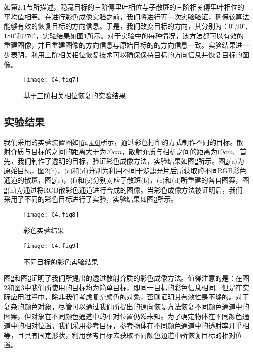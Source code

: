 如第2.1节所描述，隐藏目标的三阶傅里叶相位与子散斑的三阶相关傅里叶相位的平均值相等。在进行彩色成像实验之前，我们将进行再一次实验验证，确保该算法能够有效的恢复目标的方向信息。于是，我们改变目标的方向，其分别为：$0^{\circ}$,$90^{\circ}$,$180^{\circ}$和$270^{\circ}$，实验结果如图\ref{fig:4.7}所示。对于实验中的每种情况，该方法都可以有效的重建图像，并且重建图像的方向信息与原始目标的的方向信息一致。实验结果进一步表明，利用三阶相关相位恢复技术可以确保保持目标的方向信息并恢复目标的图像。

\begin{figure}[htp]
	\centering
	\texttt{[image: C4.fig7]}
	\caption{基于三阶相关相位恢复的实验结果}
	\label{fig:4.7}
\end{figure}

\subsection{实验结果}

我们采用的实验装置图如\ref{fig:4.6}所示，通过彩色打印的方式制作不同的目标。散射介质与目标的之间的距离大于为$70cm$，散射介质与相机之间的距离为$10cm$。首先，我们制作了透明的目标，验证彩色成像方法，实验结果如图\ref{fig:4.8}所示。图\ref{fig:4.8}(a)为原始目标，图\ref{fig:4.8}(b)，(c)和(d)分别为利用不同干涉滤光片后所获取的不同RGB彩色通道的散斑，图\ref{fig:4.8}(e)，(f)和(g)分别对应于散斑(b)，(c)和(d)所重建的各自图案，图\ref{fig:4.8}(h)为通过将RGB散彩色通道进行合成的图像。当彩色成像方法被证明后，我们采用了不同的彩色目标进行了实验，实验结果如图\ref{fig:4.9}所示。

\begin{figure}[htp]
	\centering
	\texttt{[image: C4.fig8]}
	\caption{彩色实验结果}
	\label{fig:4.8}
\end{figure}

\begin{figure}[htp]
	\centering
	\texttt{[image: C4.fig9]}
	\caption{不同目标的彩色实验结果}
	\label{fig:4.9}
\end{figure}

图\ref{fig:4.8}和图\ref{fig:4.9}证明了我们所提出的透过散射介质的彩色成像方法。值得注意的是：在图\ref{fig:4.8}和图\ref{fig:4.9}中我们所使用的目标均为简单目标，即同一目标的彩色信息相同。但是在实际应用过程中，除非我们考虑复杂颜色的对象，否则证明其有效性是不够的。对于复杂的颜色对象，尽管可以通过我们所提出的通向恢复方法恢复不同颜色通道中的图案，但对象在不同颜色通道中的相对位置仍然未知。为了确定物体在不同颜色通道中的相对位置，我们采用参考目标，参考物体在不同颜色通道中的透射率几乎相等，且具有固定形状，利用参考目标去获取不同颜色通道中所恢复目标的相对位置。

